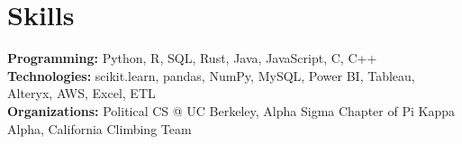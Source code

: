 \documentclass[a4paper,12pt]{article}
\begin{document}
\section{Skills}
\vspace{0.2cm}
\textbf{Programming:} Python, R, SQL, Rust, Java, JavaScript, C, C++ \\
\vspace{0.03cm}
\textbf{Technologies:} scikit.learn, pandas, NumPy, MySQL, Power BI, Tableau, Alteryx, AWS, Excel, ETL \\
\vspace{0.05cm}
\textbf{Organizations:} Political CS @ UC Berkeley, Alpha Sigma Chapter of Pi Kappa Alpha, California Climbing Team
\end{document}
